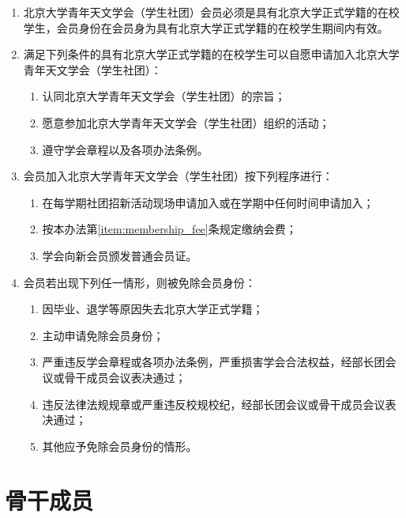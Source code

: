 \begin{enumerate}[resume]
    \item 北京大学青年天文学会（学生社团）会员必须是具有北京大学正式学籍的在校学生，会员身份在会员身为具有北京大学正式学籍的在校学生期间内有效。
    
    \item 满足下列条件的具有北京大学正式学籍的在校学生可以自愿申请加入北京大学青年天文学会（学生社团）：
    \begin{enumerate}
        \item 认同北京大学青年天文学会（学生社团）的宗旨；
        \item 愿意参加北京大学青年天文学会（学生社团）组织的活动；
        \item 遵守学会章程以及各项办法条例。
    \end{enumerate}
    
    \item 会员加入北京大学青年天文学会（学生社团）按下列程序进行：
    \begin{enumerate}
        \item 在每学期社团招新活动现场申请加入或在学期中任何时间申请加入；
        \item 按本办法第\ref{item:membership_fee}条规定缴纳会费；
        \item 学会向新会员颁发普通会员证。
    \end{enumerate}

    \item 会员若出现下列任一情形，则被免除会员身份：
    \begin{enumerate}
        \item 因毕业、退学等原因失去北京大学正式学籍；
        \item 主动申请免除会员身份；
        \item 严重违反学会章程或各项办法条例，严重损害学会合法权益，经部长团会议或骨干成员会议表决通过；
        \item 违反法律法规规章或严重违反校规校纪，经部长团会议或骨干成员会议表决通过；
        \item 其他应予免除会员身份的情形。
    \end{enumerate}
\end{enumerate}

\section{骨干成员}

